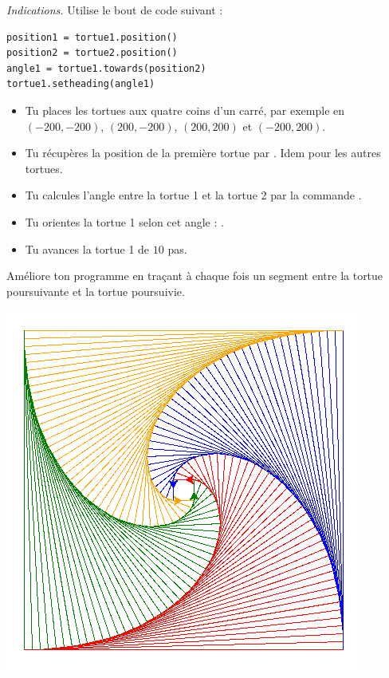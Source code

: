 \documentclass[11pt,class=report,crop=false]{standalone}
\begin{document}
\begin{activite}
\emph{Indications.}
Utilise le bout de code suivant :
\begin{center}
\begin{minipage}{0.5\textwidth}
\begin{lstlisting}
position1 = tortue1.position()
position2 = tortue2.position()
angle1 = tortue1.towards(position2)
tortue1.setheading(angle1)
\end{lstlisting}
\end{minipage}
\end{center}
\begin{itemize}
  \item Tu places les tortues aux quatre coins d'un carré, par exemple en $(-200,-200)$,
  $(200,-200)$, $(200,200)$ et $(-200,200)$.
  \item Tu récupères la position de la première tortue  par 
  .
  Idem pour les autres tortues.
  \item Tu calcules l'angle entre la tortue 1 et la tortue 2 par la commande
  .
  \item Tu orientes la tortue 1 selon cet angle :
  .
  \item Tu avances la tortue 1 de $10$ pas.
\end{itemize}

Améliore ton programme en traçant à chaque fois un segment entre la tortue poursuivante et la tortue poursuivie.

\begin{center}
\includegraphics[scale=\myscale,scale=0.5]{ecran-tortue-6b}
\end{center}  
\end{activite}
\end{document}
